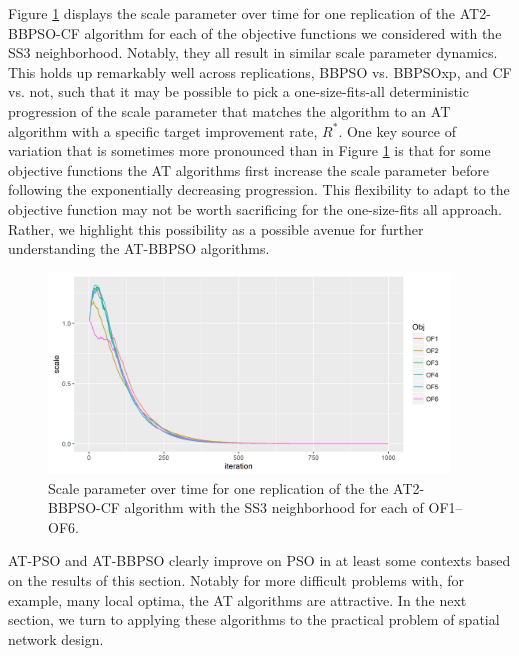 \documentclass[cmbright]{staauth}
\begin{document}
Figure \ref{fig:scale} displays the scale parameter over time for one replication of the AT2-BBPSO-CF algorithm for each of the objective functions we considered with the SS3 neighborhood. Notably, they all result in similar scale parameter dynamics. This holds up remarkably well across replications, BBPSO vs. BBPSOxp, and CF vs. not, such that it may be possible to pick a one-size-fits-all deterministic progression of the scale parameter that matches the algorithm to an AT algorithm with a specific target improvement rate, $R^*$. One key source of variation that is sometimes more pronounced than in Figure \ref{fig:scale} is that for some objective functions the AT algorithms first increase the scale parameter before following the exponentially decreasing progression. This flexibility to adapt to the objective function may not be worth sacrificing for the one-size-fits all approach. Rather, we highlight this possibility as a possible avenue for further understanding the AT-BBPSO algorithms. 

\begin{figure}[!ht]
\centering
\includegraphics[width=0.95\textwidth]{../code/psosims/scaleplot.png}
\caption{Scale parameter over time for one replication of the the AT2-BBPSO-CF algorithm with the SS3 neighborhood for each of OF1--OF6.}
\label{fig:scale}
\end{figure}

AT-PSO and AT-BBPSO clearly improve on PSO in at least some contexts based on the results of this section. Notably for more difficult problems with, for example, many local optima, the AT algorithms are attractive. In the next section, we turn to applying these algorithms to the practical problem of spatial network design.
\end{document}
